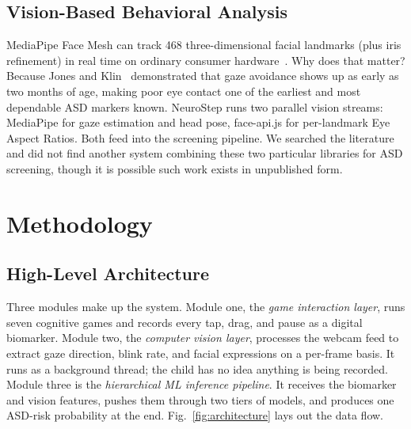 \documentclass[conference]{IEEEtran}
\begin{document}
\subsection{Vision-Based Behavioral Analysis}
MediaPipe Face Mesh can track 468 three-dimensional facial landmarks (plus iris refinement) in real time on ordinary consumer hardware~\cite{lugaresi2019mediapipe}. Why does that matter? Because Jones and Klin~\cite{jones2013attention} demonstrated that gaze avoidance shows up as early as two months of age, making poor eye contact one of the earliest and most dependable ASD markers known. NeuroStep runs two parallel vision streams: MediaPipe for gaze estimation and head pose, face-api.js for per-landmark Eye Aspect Ratios. Both feed into the screening pipeline. We searched the literature and did not find another system combining these two particular libraries for ASD screening, though it is possible such work exists in unpublished form.

\section{Methodology}

\subsection{High-Level Architecture}
Three modules make up the system. Module one, the \textit{game interaction layer}, runs seven cognitive games and records every tap, drag, and pause as a digital biomarker. Module two, the \textit{computer vision layer}, processes the webcam feed to extract gaze direction, blink rate, and facial expressions on a per-frame basis. It runs as a background thread; the child has no idea anything is being recorded. Module three is the \textit{hierarchical ML inference pipeline}. It receives the biomarker and vision features, pushes them through two tiers of models, and produces one ASD-risk probability at the end. Fig.~\ref{fig:architecture} lays out the data flow.
\end{document}
